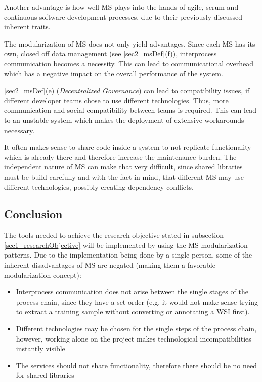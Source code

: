 Another advantage is how well MS plays into the hands of agile, scrum and continuous software development processes, due to their previously discussed inherent traits.

The modularization of MS does not only yield advantages. Since each MS has its own, closed off data management (see \ref{sec2_msDef}(f)), interprocess communication becomes a necessity. This can lead to communicational overhead which has a negative impact on the overall performance of the system\cite{Wolff16}.

\ref{sec2_msDef}(e) (\emph{Decentralized Governance}) can lead to compatibility issues, if different developer teams chose to use different technologies. Thus, more communication and social compatibility between teams is required. This can lead to an unstable system which makes the deployment of extensive workarounds necessary\cite{Riggins15}.

It often makes sense to share code inside a system to not replicate functionality which is already there and therefore increase the maintenance burden. The independent nature of MS can make that very difficult, since shared libraries must be build carefully and with the fact in mind, that different MS may use different technologies, possibly creating dependency conflicts.


\subsection{Conclusion}	
The tools needed to achieve the research objective stated in subsection \ref{sec1_researchObjective} will be implemented by using the MS modularization patterns. Due to the implementation being done by a single person, some of the inherent disadvantages of MS are negated (making them a favorable modularization concept):
\begin{itemize}
	\item Interprocess communication does not arise between the single stages of the process chain, since they have a set order (e.g. it would not make sense trying to extract a training sample without converting or annotating a WSI first).
	\item Different technologies may be chosen for the single steps of the process chain, however, working alone on the project makes technological incompatibilities instantly visible
	\item The services should not share functionality, therefore there should be no need for shared libraries
\end{itemize}
\clearpage

